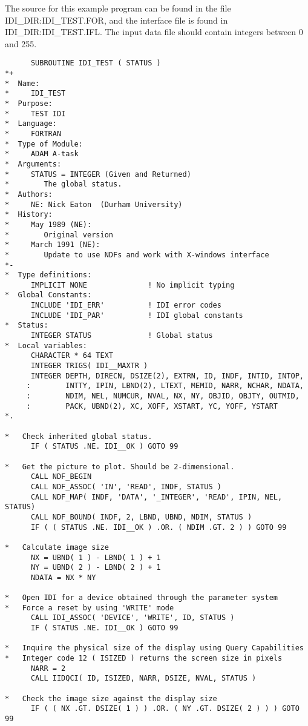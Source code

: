 The source for this example program can be found in the file
IDI\_DIR:IDI\_TEST.FOR, and the interface file is found in
IDI\_DIR:IDI\_TEST.IFL.
The input data file should contain integers between 0 and 255.

\begin{small}
\begin{verbatim}
      SUBROUTINE IDI_TEST ( STATUS )
*+
*  Name:
*     IDI_TEST
*  Purpose:
*     TEST IDI
*  Language:
*     FORTRAN
*  Type of Module:
*     ADAM A-task
*  Arguments:
*     STATUS = INTEGER (Given and Returned)
*        The global status.
*  Authors:
*     NE: Nick Eaton  (Durham University)
*  History:
*     May 1989 (NE):
*        Original version
*     March 1991 (NE):
*        Update to use NDFs and work with X-windows interface
*-
*  Type definitions:
      IMPLICIT NONE              ! No implicit typing
*  Global Constants:
      INCLUDE 'IDI_ERR'          ! IDI error codes
      INCLUDE 'IDI_PAR'          ! IDI global constants
*  Status:
      INTEGER STATUS             ! Global status
*  Local variables:
      CHARACTER * 64 TEXT
      INTEGER TRIGS( IDI__MAXTR )
      INTEGER DEPTH, DIRECN, DSIZE(2), EXTRN, ID, INDF, INTID, INTOP,
     :        INTTY, IPIN, LBND(2), LTEXT, MEMID, NARR, NCHAR, NDATA,
     :        NDIM, NEL, NUMCUR, NVAL, NX, NY, OBJID, OBJTY, OUTMID,
     :        PACK, UBND(2), XC, XOFF, XSTART, YC, YOFF, YSTART
*.

*   Check inherited global status.
      IF ( STATUS .NE. IDI__OK ) GOTO 99

*   Get the picture to plot. Should be 2-dimensional.
      CALL NDF_BEGIN
      CALL NDF_ASSOC( 'IN', 'READ', INDF, STATUS )
      CALL NDF_MAP( INDF, 'DATA', '_INTEGER', 'READ', IPIN, NEL, STATUS)
      CALL NDF_BOUND( INDF, 2, LBND, UBND, NDIM, STATUS )
      IF ( ( STATUS .NE. IDI__OK ) .OR. ( NDIM .GT. 2 ) ) GOTO 99

*   Calculate image size
      NX = UBND( 1 ) - LBND( 1 ) + 1
      NY = UBND( 2 ) - LBND( 2 ) + 1
      NDATA = NX * NY

*   Open IDI for a device obtained through the parameter system
*   Force a reset by using 'WRITE' mode
      CALL IDI_ASSOC( 'DEVICE', 'WRITE', ID, STATUS )
      IF ( STATUS .NE. IDI__OK ) GOTO 99

*   Inquire the physical size of the display using Query Capabilities
*   Integer code 12 ( ISIZED ) returns the screen size in pixels
      NARR = 2
      CALL IIDQCI( ID, ISIZED, NARR, DSIZE, NVAL, STATUS )

*   Check the image size against the display size
      IF ( ( NX .GT. DSIZE( 1 ) ) .OR. ( NY .GT. DSIZE( 2 ) ) ) GOTO 99


\end{verbatim}
\end{small}
